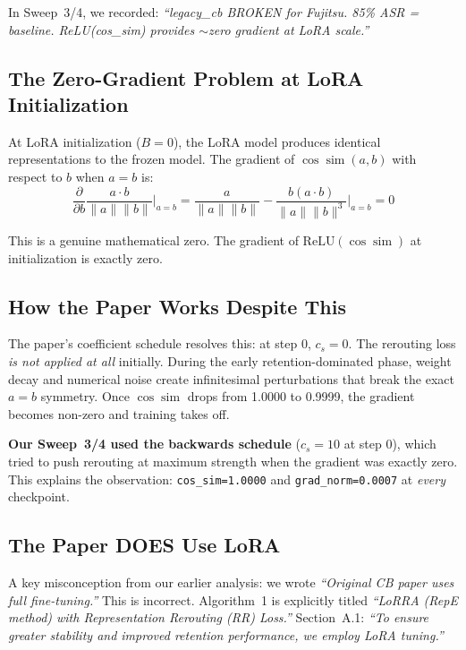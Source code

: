 \documentclass[11pt]{article}
\begin{document}
In Sweep~3/4, we recorded: \emph{``legacy\_cb BROKEN for Fujitsu. 85\% ASR =
baseline. ReLU(cos\_sim) provides $\sim$zero gradient at LoRA scale.''}

\subsection{The Zero-Gradient Problem at LoRA Initialization}

At LoRA initialization ($B=0$), the LoRA model produces identical
representations to the frozen model. The gradient of
$\cos\!\operatorname{sim}(a, b)$ with respect to $b$ when $a = b$ is:
\[
  \frac{\partial}{\partial b} \frac{a \cdot b}{\|a\| \|b\|} \bigg|_{a=b}
  = \frac{a}{\|a\|\|b\|} - \frac{b(a \cdot b)}{\|a\|\|b\|^3} \bigg|_{a=b} = 0
\]

This is a genuine mathematical zero. The gradient of $\mathrm{ReLU}(\cos\!\operatorname{sim})$
at initialization is exactly zero.

\subsection{How the Paper Works Despite This}

The paper's coefficient schedule resolves this: at step 0, $c_s = 0$. The
rerouting loss \emph{is not applied at all} initially. During the early
retention-dominated phase, weight decay and numerical noise create infinitesimal
perturbations that break the exact $a = b$ symmetry. Once
$\cos\!\operatorname{sim}$ drops from 1.0000 to 0.9999, the gradient becomes
non-zero and training takes off.

\textbf{Our Sweep~3/4 used the backwards schedule} ($c_s = 10$ at step 0),
which tried to push rerouting at maximum strength when the gradient was exactly
zero. This explains the observation: \texttt{cos\_sim=1.0000} and
\texttt{grad\_norm=0.0007} at \emph{every} checkpoint.

\subsection{The Paper DOES Use LoRA}

A key misconception from our earlier analysis: we wrote \emph{``Original CB
paper uses full fine-tuning.''} This is incorrect. Algorithm~1 is explicitly
titled \emph{``LoRRA (RepE method) with Representation Rerouting (RR) Loss.''}
Section~A.1: \emph{``To ensure greater stability and improved retention
performance, we employ LoRA tuning.''}
\end{document}
